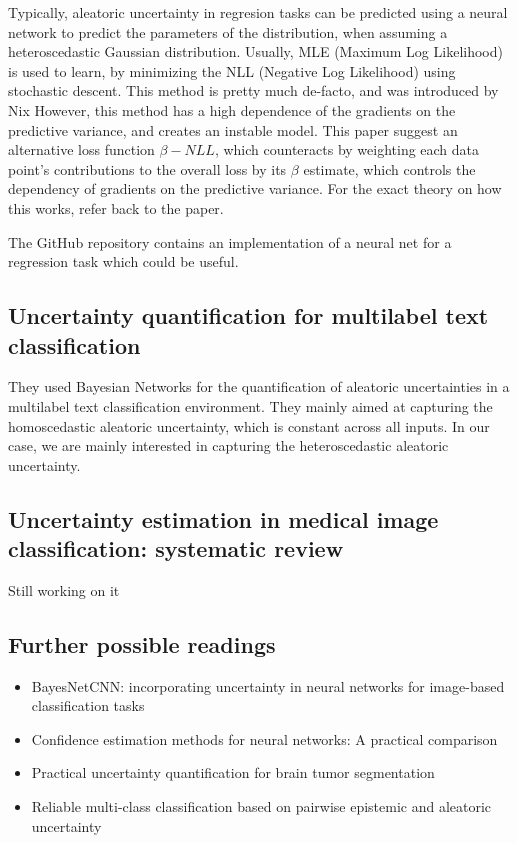 \documentclass[10pt]{article}
\begin{document}
Typically, aleatoric uncertainty in regresion tasks can be predicted using a neural network to predict the parameters of the distribution, 
when assuming a heteroscedastic Gaussian distribution.
Usually, MLE (Maximum Log Likelihood) is used to learn, by minimizing the NLL (Negative Log Likelihood) using stochastic descent.
This method is pretty much de-facto, and was introduced by Nix\cite{nix1994estimating}
However, this method has a high dependence of the gradients on the predictive variance, and creates an instable model.
This paper suggest an alternative loss function $\beta-NLL$, which counteracts by weighting each data point's contributions to the overall loss by its $\beta$ estimate, 
which controls the dependency of gradients on the predictive variance. For the exact theory on how this works, refer back to the paper.

The GitHub repository contains an implementation of a neural net for a regression task which could be useful.

\subsection*{Uncertainty quantification for multilabel text classification \cite{chen2020uncertainty}}
They used Bayesian Networks for the quantification of aleatoric uncertainties in a multilabel text classification environment.
They mainly aimed at capturing the homoscedastic aleatoric uncertainty, which is constant across all inputs. In our case, we are mainly interested in capturing the heteroscedastic aleatoric uncertainty.

\subsection*{Uncertainty estimation in medical image classification: systematic review \cite{kurz2022uncertainty}}
Still working on it

\subsection*{Further possible readings}
\begin{itemize}
    \item BayesNetCNN: incorporating uncertainty in neural networks for image-based classification tasks \cite{ferrante2022bayesnetcnn}
    \item Confidence estimation methods for neural networks: A practical comparison \cite{papadopoulos2001confidence}
    \item Practical uncertainty quantification for brain tumor segmentation \cite{fuchs2021practical}
    \item Reliable multi-class classification based on pairwise epistemic and aleatoric uncertainty\cite{nguyen2018reliable}
\end{itemize}


 

\end{document}
